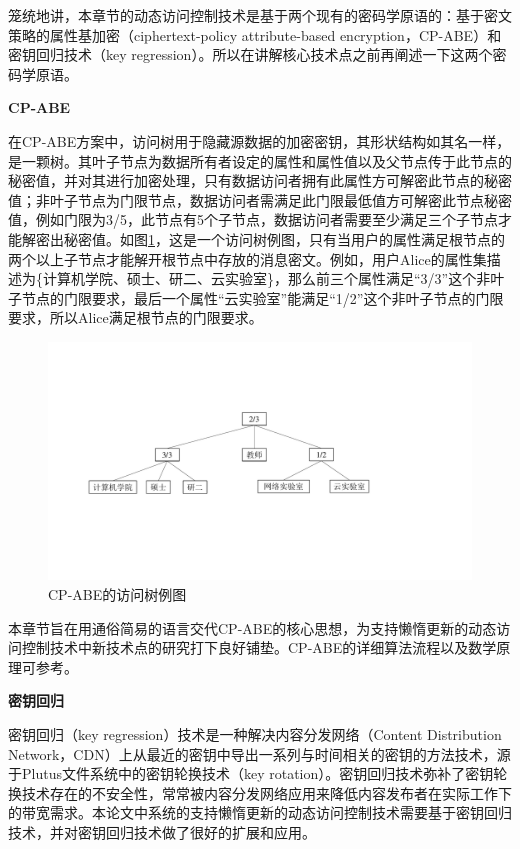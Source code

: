 \documentclass[promaster]{thesis-uestc}
\begin{document}
笼统地讲，本章节的动态访问控制技术是基于两个现有的密码学原语的：基于密文策略的属性基加密（ciphertext-policy attribute-based encryption，CP-ABE）和密钥回归技术（key regression）。所以在讲解核心技术点之前再阐述一下这两个密码学原语。

\textbf{CP-ABE}

在CP-ABE方案中，访问树用于隐藏源数据的加密密钥，其形状结构如其名一样，是一颗树。其叶子节点为数据所有者设定的属性和属性值以及父节点传于此节点的秘密值，并对其进行加密处理，只有数据访问者拥有此属性方可解密此节点的秘密值；非叶子节点为门限节点，数据访问者需满足此门限最低值方可解密此节点秘密值，例如门限为3/5，此节点有5个子节点，数据访问者需要至少满足三个子节点才能解密出秘密值。如图\ref{CP-ABE的访问树例图}，这是一个访问树例图，只有当用户的属性满足根节点的两个以上子节点才能解开根节点中存放的消息密文。例如，用户Alice的属性集描述为\{计算机学院、硕士、研二、云实验室\}，那么前三个属性满足“3/3”这个非叶子节点的门限要求，最后一个属性“云实验室”能满足“1/2”这个非叶子节点的门限要求，所以Alice满足根节点的门限要求。

\begin{figure}[htbp]
    \centering
    \includegraphics[width = 0.9\linewidth]{pic/基于密文策略的属性基加密例图.pdf}
    \caption{CP-ABE的访问树例图}
    \label{CP-ABE的访问树例图}
\end{figure}

本章节旨在用通俗简易的语言交代CP-ABE的核心思想，为支持懒惰更新的动态访问控制技术中新技术点的研究打下良好铺垫。CP-ABE的详细算法流程以及数学原理可参考\cite{bethencourt2007ciphertext}。

\textbf{密钥回归}\label{密钥回归}

密钥回归（key regression）技术是一种解决内容分发网络（Content Distribution Network，CDN）上从最近的密钥中导出一系列与时间相关的密钥的方法技术，源于Plutus文件系统中的密钥轮换技术（key rotation）。密钥回归技术弥补了密钥轮换技术存在的不安全性，常常被内容分发网络应用来降低内容发布者在实际工作下的带宽需求。本论文中系统的支持懒惰更新的动态访问控制技术需要基于密钥回归技术，并对密钥回归技术做了很好的扩展和应用。
\end{document}
